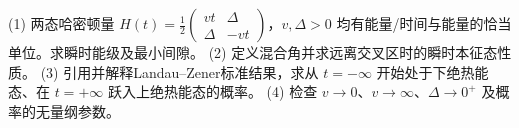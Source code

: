 (1) 两态哈密顿量 \(H(t)=\frac12\begin{pmatrix}vt&\Delta\\\Delta&-vt\end{pmatrix}\)，\(v,\Delta>0\) 均有能量/时间与能量的恰当单位。求瞬时能级及最小间隙。
(2) 定义混合角并求远离交叉区时的瞬时本征态性质。
(3) 引用并解释Landau–Zener标准结果，求从 \(t=-\infty\) 开始处于下绝热能态、在 \(t=+\infty\) 跃入上绝热能态的概率。
(4) 检查 \(v\to0\)、\(v\to\infty\)、\(\Delta\to0^+\) 及概率的无量纲参数。

